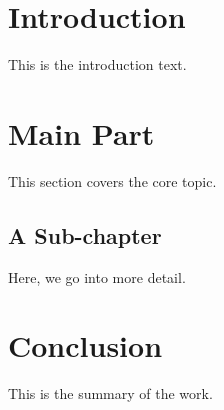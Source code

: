 



\maketitle
\thispagestyle{empty} %
\newpage

\tableofcontents
\newpage


\section{Introduction}
This is the introduction text. \lipsum[1-2]

\section{Main Part}
This section covers the core topic. \lipsum[3-4]

\subsection{A Sub-chapter}
Here, we go into more detail. \lipsum[5]


\section{Conclusion}
This is the summary of the work. \lipsum[6]

